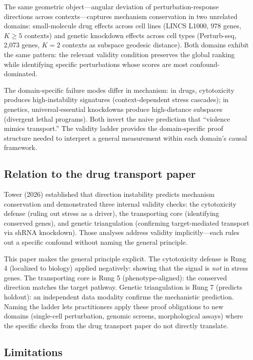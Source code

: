 \documentclass{article}
\begin{document}
The same geometric object---angular deviation of perturbation-response
directions across contexts---captures mechanism conservation in two
unrelated domains: small-molecule drug effects across cell lines (LINCS
L1000, 978 genes, $K \geq 5$ contexts) and genetic knockdown effects across
cell types (Perturb-seq, 2{,}073 genes, $K = 2$ contexts as subspace
geodesic distance). Both domains exhibit the same pattern: the relevant
validity condition preserves the global ranking while identifying specific
perturbations whose scores are most confound-dominated.

The domain-specific failure modes differ in mechanism: in drugs, cytotoxicity
produces high-instability signatures (context-dependent stress cascades); in
genetics, universal-essential knockdowns produce high-distance subspaces
(divergent lethal programs). Both invert the naive prediction that
``violence mimics transport.'' The validity ladder provides the
domain-specific proof structure needed to interpret a general measurement
within each domain's causal framework.

\subsection{Relation to the drug transport paper}

Tower (2026) established that direction instability predicts mechanism
conservation and demonstrated three internal validity checks: the cytotoxicity
defense (ruling out stress as a driver), the transporting core (identifying
conserved genes), and genetic triangulation (confirming target-mediated
transport via shRNA knockdown). Those analyses address validity implicitly---each
rules out a specific confound without naming the general principle.

This paper makes the general principle explicit. The cytotoxicity defense is
Rung 4 (localized to biology) applied negatively: showing that the signal is
\emph{not} in stress genes. The transporting core is Rung 5 (phenotype-aligned):
the conserved direction matches the target pathway. Genetic triangulation is
Rung 7 (predicts holdout): an independent data modality confirms the mechanistic
prediction. Naming the ladder lets practitioners apply these proof obligations
to new domains (single-cell perturbation, genomic screens, morphological
assays) where the specific checks from the drug transport paper do not
directly translate.

\subsection{Limitations}
\end{document}
